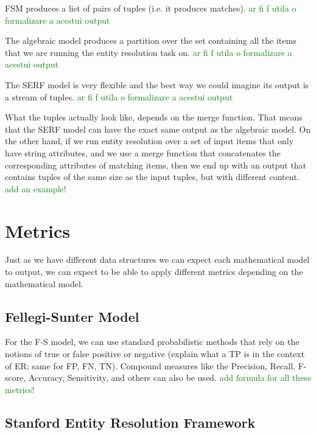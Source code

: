 \documentclass[11pt]{article}
\begin{document}
    FSM produces a list of pairs of tuples (i.e. it produces matches). 
    \textcolor{green}{ar fi f utila o formalizare a acestui output}

    The algebraic model produces a partition over the set containing all the items that we are running the entity resolution task on.
    \textcolor{green}{ar fi f utila o formalizare a acestui output}

    The SERF model is very flexible and the best way we could imagine its output is a stream of tuples. 
    \textcolor{green}{ar fi f utila o formalizare a acestui output}

    What the tuples actually look like, depends on the merge function. That means that the SERF model can have the exact same output as the algebraic model. On the other hand, if we run entity resolution over a set of input items that only have string attributes, and we use a merge function that concatenates the corresponding attributes of matching items, then we end up with an output that contains tuples of the same size as the input tuples, but with different content.
    \textcolor{green}{add an example!}

    \section{Metrics}\label{section:metrics}
    
    Just as we have different data structures we can expect each mathematical model to output, we can expect to be able
    to apply different metrics depending on the mathematical model.

    \subsection[fsm]{Fellegi-Sunter Model}\label{subsec:fellegi-sunter-model}
    
    For the F-S model, we can use standard probabilistic methods that rely on the notions of true or false positive or negative (explain what a TP is in the context of ER; same for FP, FN, TN). Compound measures like the Precision, Recall, F-score, Accuracy, Sensitivity, and others can also be used. 
    \textcolor{green}{add formula for all these metrics!}


    \subsection[serf]{Stanford Entity Resolution Framework}\label{subsec:stanford-entity-resolution-framework}
    
\end{document}
